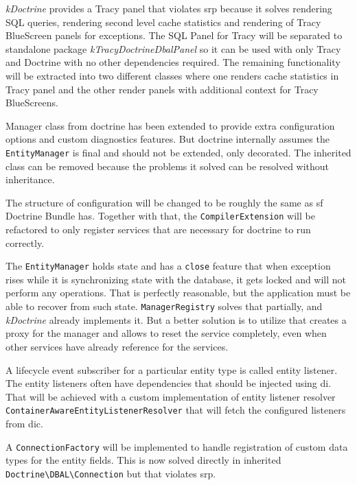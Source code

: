 \textit{\gls{kDoctrine}} provides a Tracy panel that violates \gls{srp} because it solves rendering SQL queries, rendering second level cache statistics and rendering of Tracy BlueScreen panels for exceptions. The SQL Panel for Tracy will be separated to standalone package \textit{\gls{kTracyDoctrineDbalPanel}} so it can be used with only Tracy and Doctrine with no other dependencies required. The remaining functionality will be extracted into two different classes where one renders cache statistics in Tracy panel and the other render panels with additional context for Tracy BlueScreens.

Manager class from \gls{doctrine} has been extended to provide extra configuration options and custom diagnostics features. But \gls{doctrine} internally assumes the \lstinline{EntityManager} is final and should not be extended, only decorated. The inherited class can be removed because the problems it solved can be resolved without inheritance.

\begin{sloppypar}
The structure of configuration will be changed to be roughly the same as \gls{sf} Doctrine Bundle has. Together with that, the \lstinline{CompilerExtension} will be refactored to only register services that are necessary for \gls{doctrine} to run correctly.
\end{sloppypar}

The \lstinline{EntityManager} holds state and has a \lstinline{close} feature that when exception rises while it is synchronizing state with the database, it gets locked and will not perform any operations. That is perfectly reasonable, but the application must be able to recover from such state. \lstinline{ManagerRegistry} solves that partially, and \textit{\gls{kDoctrine}} already implements it. But a better solution is to utilize  that creates a proxy for the manager and allows to reset the service completely, even when other services have already reference for the services.

A lifecycle event subscriber for a particular entity type is called entity listener. The entity listeners often have dependencies that should be injected using \gls{di}. That will be achieved with a custom implementation of entity listener resolver \lstinline{ContainerAwareEntityListenerResolver} that will fetch the configured listeners from \gls{dic}.

A \lstinline{ConnectionFactory} will be implemented to handle registration of custom data types for the entity fields. This is now solved directly in inherited \lstinline{Doctrine\DBAL\Connection} but that violates \gls{srp}.

